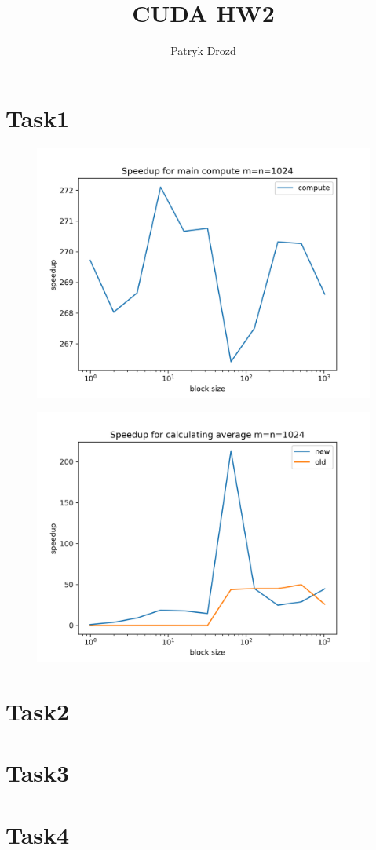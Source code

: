 \documentclass[a4paper]{article}
\title{CUDA HW2}
\author{Patryk Drozd}
\begin{document}
\date{}
\maketitle

\section{Task1}

	\begin{figure}[h!]
	    \centering
    	\includegraphics[width=.5\linewidth]{../compute_plot_m1024.png}
	\end{figure}

	\begin{figure}[h!]
	    \centering
    	\includegraphics[width=.5\linewidth]{../reduce_plot_m1024.png}
	\end{figure}

\section{Task2}
\section{Task3}
\section{Task4}

 
 
\end{document}
